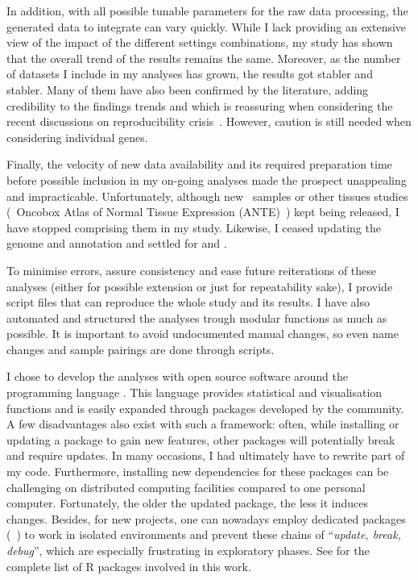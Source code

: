 In addition, with all possible tunable parameters for the raw data processing,
the generated data to integrate can vary quickly.
While I lack providing an extensive view of
the impact of the different settings combinations,
my study has shown that the overall trend of the results remains the same.
Moreover, as the number of datasets I include in my analyses has grown,
the results got stabler and stabler.
Many of them have also been confirmed by the literature,
adding credibility to the findings trends
and which is reassuring when
considering the recent discussions on reproducibility crisis~.
However, caution is still needed when considering individual genes.\mybr\

Finally, the velocity of new data availability
and its required preparation time
before possible inclusion in my on-going analyses
made the prospect unappealing and impracticable.
Unfortunately, although new \gtex\ samples or other tissues studies
(\eg\ Oncobox Atlas of Normal Tissue Expression (ANTE)~)
kept being released,
I have stopped comprising them in my study.
Likewise, I ceased updating the genome and annotation
and settled for  and .

To minimise errors,
assure consistency and ease future reiterations of these analyses
(either for possible extension or just for repeatability sake),
I provide script files that can reproduce the whole study and its results.
I have also automated and structured the analyses trough modular functions
as much as possible.
It is important to avoid undocumented manual changes,
so even name changes and sample pairings are done through scripts.

I chose to develop the analyses with open source software
around the programming language .
This language provides statistical and visualisation functions
and is easily expanded through packages developed by the community.
A few disadvantages also exist with such a framework:
often, while installing or updating a package to gain new features,
other packages will potentially break and require updates.
In many occasions, I had ultimately have to rewrite part of my code.
Furthermore, installing new dependencies for these packages can be challenging
on distributed computing facilities compared to one personal computer.
Fortunately, the older the updated package, the less it induces changes.
Besides, for new projects, one can nowadays employ dedicated packages
(\eg\ )
to work in isolated environments and
prevent these chains of \enquote{\emph{update, break, debug}},
which are especially frustrating in exploratory phases.
See  for the complete list of \textsf{R} packages
involved in this work.

